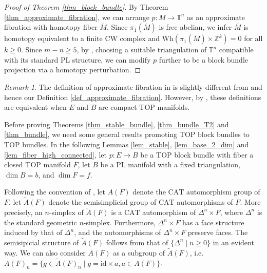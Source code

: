 \documentclass[12pt]{amsart}
\theoremstyle{plain}
\theoremstyle{definition}
\theoremstyle{question}
\theoremstyle{remark}
\newtheorem{remark}[theorem]{Remark}
\theoremstyle{assumption}
\numberwithin{equation}{section}
\theoremstyle{bigthm}
\begin{document}
\begin{proof}[Proof of Theorem \ref{thm_block_bundle}]
By Theorem \ref{thm_approximate_fibration}, we can arrange $p \colon  M \rightarrow \mathbb{T}^{n}$ as an approximate fibration with homotopy fiber $\overline{M}$. Since $\pi_{1} (\overline{M})$ is free abelian, we infer $\overline{M}$ is homotopy equivalent to a finite CW complex and $\mathrm{Wh} (\pi_{1} (\overline{M}) \times \mathbb{Z}^{k}) =0$ for all $k \ge 0$. Since $m-n \ge 5$, by \cite[Theorem~3.3.2]{Quinn79}, choosing a suitable triangulation of $\mathbb{T}^{n}$ compatible with its standard $\mathrm{PL}$ structure, we can modify $p$ further to be a block bundle projection via a homotopy perturbation.
\end{proof}

\begin{remark}
The definition of approximate fibration in \cite[\S~3.3]{Quinn79} is slightly different from \cite[Definition~2.2]{FLS2018} and hence our Definition \ref{def_approximate_fibration}. However, by \cite[Theorem~12.13]{HTW90}, these definitions are equivalent when $E$ and $B$ are compact $\mathrm{TOP}$ manifolds.
\end{remark}

Before proving Theorems \ref{thm_stable_bundle}, \ref{thm_bundle_T2} and \ref{thm_bundle}, we need some general results promoting $\mathrm{TOP}$ block bundles to $\mathrm{TOP}$ bundles. In the following Lemmas \ref{lem_stable}, \ref{lem_base_2_dim} and \ref{lem_fiber_high_connected}, let $p \colon  E \rightarrow B$ be a $\mathrm{TOP}$ block bundle with fiber a closed $\mathrm{TOP}$ manifold $F$, let $B$ be a $\mathrm{PL}$ manifold with a fixed triangulation, $\dim B =b$, and $\dim F = f$.

Following the convention of \cite{BLR1975}, let $A(F)$ denote the $\mathrm{CAT}$ automorphism group of $F$, let $\tilde{A}(F)$ denote the semisimplicial group of $\mathrm{CAT}$ automorphisms of $F$. More precisely, an $n$-simplex of $\tilde{A}(F)$ is a $\mathrm{CAT}$ automorphism of $\Delta^{n} \times F$, where $\Delta^{n}$ is the standard geometric $n$-simplex. Furthermore, $\Delta^{n} \times F$ has a face structure induced by that of $\Delta^{n}$, and the automorphisms of $\Delta^{n} \times F$ preserve faces. The semisipicial structure of $\tilde{A}(F)$ follows from that of $\{ \Delta^{n} \mid n \geq 0 \}$ in an evident way. We can also consider $A(F)$ as a subgroup of $\tilde{A}(F)$, i.e. $A(F)_{n} = \{ g \in \tilde{A}(F)_{n} \mid g= \mathrm{id} \times a, a \in A(F) \}$.
\end{document}
